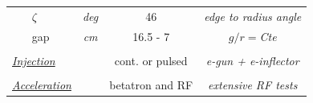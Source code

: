 \documentclass[12pt]{article}
\begin{document}
\begin{minipage}[b]{1.\linewidth}
{\begin{minipage}[b]{.63\linewidth}
\begin{center}
\begin{tabular}{llccc}
      &  $\zeta$ &\it deg&  46       &  \it edge to radius angle  \\
      &   gap      &\it cm  &      16.5  - 7     &   \it $g/r=$Cte  \\
\\[-1.50ex]
\multicolumn{2}{l}{\it  \underline{Injection}}&   &cont. or pulsed &  \it e-gun + e-inflector \\
\\[-1.50ex]
\multicolumn{2}{l}{\it  \underline{Acceleration}}&&    \sf betatron and RF   & \it extensive RF tests   \\
   \end{tabular}
  \end{center}

~~~~~~~~~~~~~~~

~~~~~~~~~~~~~~~

~~~~~~~~~~~~~~~

~~~~~~~~~~~~~~~

~~~~~~~~~~~~~~~

\end{minipage}

}
\end{minipage}




\end{document}
